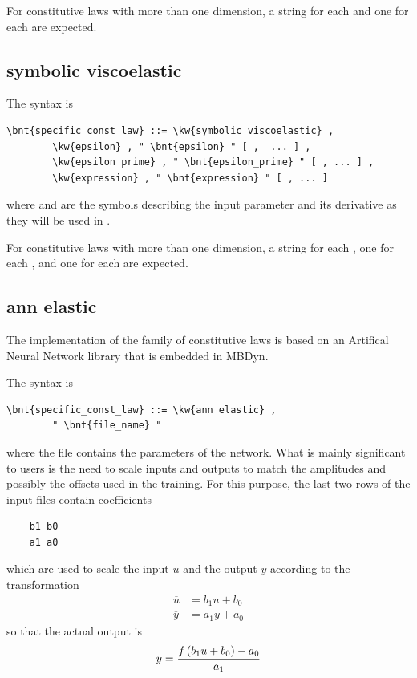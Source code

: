 For constitutive laws with more than one dimension,
a string for each  and one for each 
are expected.

\subsection{symbolic viscoelastic}\label{sec:CL:SYMBOLIC-VISCOELASTIC}
The syntax is
\begin{Verbatim}[commandchars=\\\{\}]
    \bnt{specific_const_law} ::= \kw{symbolic viscoelastic} ,
        \kw{epsilon} , " \bnt{epsilon} " [ ,  ... ] ,
        \kw{epsilon prime} , " \bnt{epsilon_prime} " [ , ... ] ,
        \kw{expression} , " \bnt{expression} " [ , ... ]
\end{Verbatim}
where  and  are the symbols describing 
the input parameter and its derivative as they will be used
in .

For constitutive laws with more than one dimension,
a string for each , one for each ,
and one for each  are expected.

\subsection{ann elastic}\label{sec:CL:ANN-ELASTIC}
The implementation  of the family of  constitutive laws
is based on an Artifical Neural Network library that is embedded in MBDyn.

The syntax is
\begin{Verbatim}[commandchars=\\\{\}]
    \bnt{specific_const_law} ::= \kw{ann elastic} ,
        " \bnt{file_name} "
\end{Verbatim}
where the file  contains the parameters of the network.
What is mainly significant to users is the need to scale inputs and outputs
to match the amplitudes and possibly the offsets used in the training.
For this purpose, the last two rows of the input files contain coefficients
\begin{verbatim}
    b1 b0
    a1 a0
\end{verbatim}
which are used to scale the input $u$ and the output $y$ according
to the transformation
\begin{align}
	\overline{u} &= b_1 u + b_0 \\
	\overline{y} &= a_1 y + a_0
\end{align}
so that the actual output is
\begin{equation}
	y = \frac{f\left( b_1 u + b_0 \right) - a_0}{a_1}
\end{equation}

